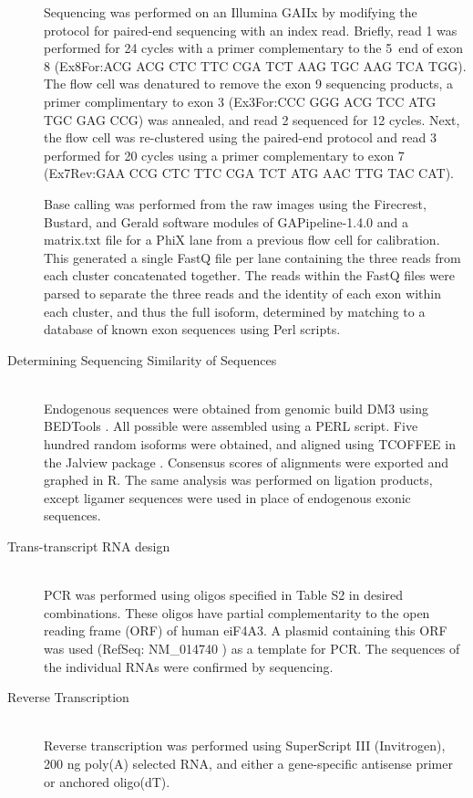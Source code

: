 \begin{description}
		Sequencing was performed on an Illumina GAIIx by modifying the protocol for paired-end sequencing with an index read. Briefly, read 1 was performed for 24 cycles with a primer complementary to the 5\textprime~end of exon 8 (Ex8For:ACG ACG CTC TTC CGA TCT AAG TGC AAG TCA TGG). The flow cell was denatured to remove the exon 9 sequencing products, a primer complimentary to exon 3 (Ex3For:CCC GGG ACG TCC ATG TGC GAG CCG) was annealed, and read 2 sequenced for 12 cycles. Next, the flow cell was re-clustered using the paired-end protocol and read 3 performed for 20 cycles using a primer complementary to exon 7 (Ex7Rev:GAA CCG CTC TTC CGA TCT ATG AAC TTG TAC CAT).

		Base calling was performed from the raw images using the Firecrest, Bustard, and Gerald software modules of GAPipeline-1.4.0 and a matrix.txt file for a PhiX lane from a previous flow cell for calibration. This generated a single FastQ file per lane containing the three reads from each cluster concatenated together. The reads within the FastQ files were parsed to separate the three reads and the identity of each exon within each cluster, and thus the full isoform, determined by matching to a database of known exon sequences using Perl scripts.
		
		\item[Determining Sequencing Similarity of \dscam{} Sequences] \hfill \\
		Endogenous \dscam{} sequences were obtained from genomic build DM3 using BEDTools \citep{Quinlan2010}. All possible \dscam{} were assembled using a PERL script. Five hundred random isoforms were obtained, and aligned using TCOFFEE \citep{Notredame2000} in the Jalview package \citep{Waterhouse2009}. Consensus scores of alignments were exported and graphed in R. The same analysis was performed on \dscam{} ligation products, except ligamer sequences were used in place of endogenous exonic sequences.
		
		\item[Trans-transcript RNA design] \hfill \\
		PCR was performed using oligos specified in Table S2 in desired combinations. These oligos have partial complementarity to the open reading frame (ORF) of human eiF4A3. A plasmid containing this ORF was used (RefSeq: NM_014740 ) as a template for PCR. The sequences of the individual RNAs were confirmed by sequencing. 

		\item[Reverse Transcription] \hfill \\
		Reverse transcription was performed using SuperScript III (Invitrogen), 200 ng poly(A) selected RNA, and either a gene-specific antisense primer or anchored oligo(dT).


\end{description}
